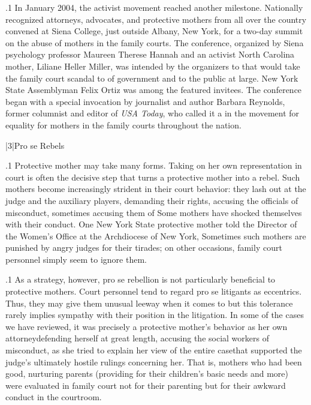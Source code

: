 \documentclass[11pt, twoside]{article}
\begin{document}
{\p.1{%
\:In January 2004, the activist movement reached another milestone.
Nationally recognized attorneys, advocates, and protective mothers
from all over the country convened at Siena College, just outside Albany, New York, for a two-day summit on the abuse of mothers in the
family courts. The conference, organized by Siena psychology professor Maureen Therese Hannah and an activist North Carolina mother,
Liliane Heller Miller, was intended by the organizers to  that would take the family court scandal to  of government and to the public at large. New York State
Assemblyman Felix Ortiz was among the featured invitees. The conference began with a special invocation by journalist and author Barbara Reynolds,
former columnist and editor of \textit{USA Today}, who called it a  in the movement for equality for mothers in the family courts
throughout the nation.\;
}%


\s|3|{Pro se Rebels}

\p.1{%
\noindent{}\:Protective mother  may take many forms. Taking on her own
representation in court is often the decisive step that turns a protective
mother into a rebel. Such mothers become increasingly strident in their
court behavior: they lash out at the judge and the auxiliary players, demanding their rights, accusing the officials of misconduct, sometimes
accusing them of  Some mothers have shocked themselves with their conduct. One New York State protective mother told
the Director of the Women’s Office at the Archdiocese of New York,  Sometimes such mothers are
punished by angry judges for their tirades; on other occasions, family
court personnel simply seem to ignore them.\;
}%

\p.1{%
\:As a strategy, however, pro se rebellion is not particularly beneficial
to protective mothers. Court personnel tend to regard pro se litigants as
eccentrics. Thus, they may give them unusual leeway when it comes to
 but this tolerance rarely implies sympathy with their position in the litigation. In some of the cases we have reviewed, it was
precisely a protective mother’s behavior as her own attorney\mdash{}defending
herself at great length, accusing the social workers of misconduct,  as she tried to explain her view of the entire case\mdash{}that supported
the judge’s ultimately hostile rulings concerning her. That is, mothers
who had been good, nurturing parents (providing for their children’s
basic needs and more) were evaluated in family court not for their
parenting but for their awkward conduct in the courtroom.\;
}%


}
\end{document}
